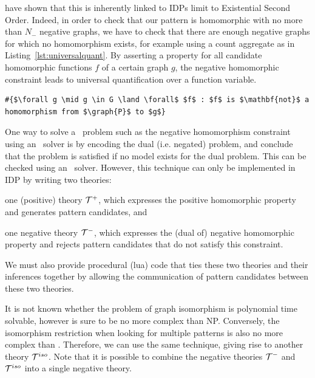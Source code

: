 \citep{} have shown that this is inherently linked to IDPs limit to Existential Second Order.
Indeed, in order to check that our pattern  is homomorphic with no more than $N_{-}$ negative graphs, we have to check that there are enough negative graphs for which no homomorphism exists, for example using a count aggregate as in Listing~\ref{lst:universalquant}.
By asserting a property for all candidate homomorphic functions $f$ of a certain graph $g$, the negative homomorphic constraint leads to universal quantification over a function variable.

\vspace{-0.5em}
\begin{center}
\begin{minipage}{0.62\linewidth}
\begin{lstlisting}[mathescape, caption=Quantifying over functions outside the vocabulary, label=lst:universalquant]
#{$\forall g \mid g \in G \land \forall$ $f$ : $f$ is $\mathbf{not}$ a homomorphism from $\graph{P}$ to $g$}
\end{lstlisting}
\end{minipage}
\end{center}
\vspace{-0.5em}

One way to solve a \coNP\ problem such as the negative homomorphism constraint using an \NP\ solver is by encoding the dual (i.e. negated) problem, and conclude that the problem is satisfied if no model exists for the dual problem.
This can be checked using an \NP\ solver.
However, this technique can only be implemented in IDP by writing two theories: 
\begin{compactitem}
\item one (positive) theory $\mathcal{T}^{+}$, which expresses the positive homomorphic property and generates pattern candidates, and
\item one negative theory $\mathcal{T}^{-}$, which expresses the (dual of) negative homomorphic property and rejects pattern candidates that do not satisfy this constraint.
\end{compactitem}
We must also provide procedural (lua) code that ties these two theories and their inferences together by allowing the communication of pattern candidates between these two theories.

It is not known whether the problem of graph isomorphism is polynomial time solvable,
however is sure to be no more complex than NP.
Conversely, the isomorphism restriction when looking for multiple patterns is also no more complex than \coNP.
Therefore, we can use the same technique, giving rise to another theory $\mathcal{T}^{iso}$.
Note that it is possible to combine the negative theories $\mathcal{T}^{-}$ and $\mathcal{T}^{iso}$ into a single negative theory.


